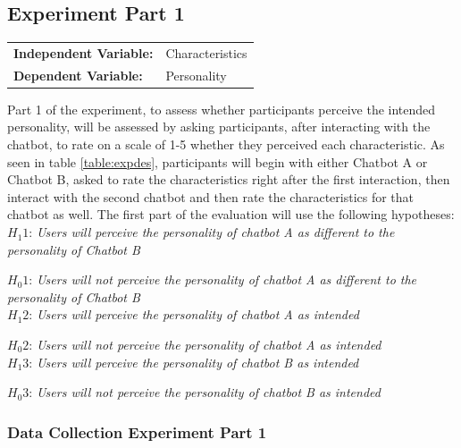 \vspace{2,5mm}

\subsection{Experiment Part 1}

\vspace{2,5mm}

\begin{tabular}{ l l }
    \textbf{Independent Variable:} & Characteristics \\ 
    \textbf{Dependent Variable:} & Personality \\  
\end{tabular}

\vspace{2,5mm}

Part 1 of the experiment, to assess whether participants perceive the intended personality, will be assessed by asking participants, after interacting with the chatbot, to rate on a scale of 1-5 whether they perceived each characteristic. As seen in table \ref{table:expdes}, participants will begin with either Chatbot A or Chatbot B, asked to rate the characteristics right after the first interaction, then interact with the second chatbot and then rate the characteristics for that chatbot as well. The first part of the evaluation will use the following hypotheses:\\
    
    $H_{1} 1$: \textit{Users will perceive the personality of chatbot A as different to the personality of Chatbot B}
    
    $H_{0} 1$: \textit{Users will not perceive the personality of chatbot A as different to the personality of Chatbot B} \\
  
    $H_{1} 2$: \textit{Users will perceive the personality of chatbot A as intended} 
    
    $H_{0} 2$: \textit{Users will not perceive the personality of chatbot A as intended}\\
   
    $H_{1} 3$: \textit{Users will perceive the personality of chatbot B as intended}
   
    $H_{0} 3$: \textit{Users will not perceive the personality of chatbot B as intended}\\
    

\subsubsection{Data Collection Experiment Part 1}

